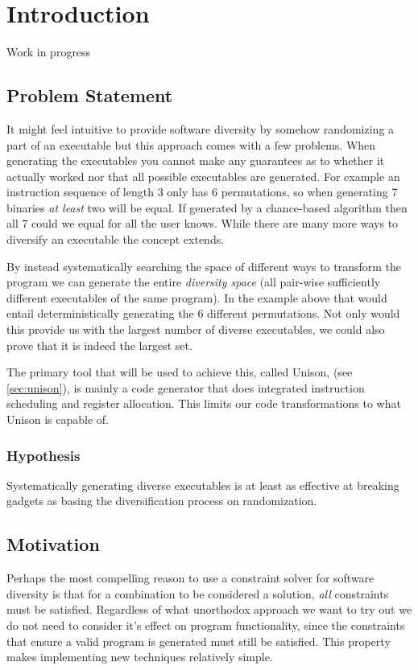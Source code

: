 \chapter{Introduction}

Work in progress

\section{Problem Statement}

It might feel intuitive to provide software diversity by somehow randomizing a part of an
executable but this approach comes with a few problems. When generating the executables
you cannot make any guarantees as to whether it actually worked nor that all possible executables
are generated. For example an instruction sequence of length 3 only has 6 permutations, so
when generating 7 binaries \textit{at least} two will be equal. If generated by a chance-based
algorithm then all 7 could we equal for all the user knows. While there are many more ways
to diversify an executable the concept extends.

By instead systematically searching the space of different ways to transform the program
we can generate the entire \textit{diversity space} (all pair-wise sufficiently different
executables of the same program). In the example above that would entail deterministically
generating the 6 different permutations. Not only would this provide us with the largest
number of diverse executables, we could also prove that it is indeed the largest set.

The primary tool that will be used to achieve this, called Unison, (see \ref{sec:unison}),
is mainly a code generator that does integrated instruction scheduling and register
allocation. This limits our code transformations to what Unison is capable of.

\subsection{Hypothesis}

Systematically generating diverse executables is at least as effective at breaking gadgets
as basing the diversification process on randomization.

\section{Motivation}

Perhaps the most compelling reason to use a constraint solver for software diversity is that
for a combination to be considered a solution, \textit{all} constraints must be satisfied.
Regardless of what unorthodox approach we want to try out we do not need to consider it's
effect on program functionality, since the constraints that ensure a valid program is
generated must still be satisfied. This property makes implementing new techniques
relatively simple.
